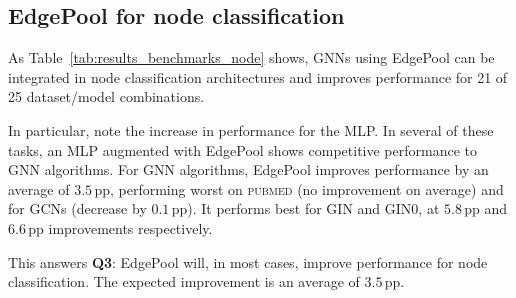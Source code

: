 \documentclass{article}
\newcommand{\tableref}[1]{Table~\ref{#1}}
\newcommand{\edgepool}{EdgePool}
\newcommand{\datasetname}[1]{\textsc{#1}}
\newcommand{\pubmed}{\datasetname{pubmed}}
\newcommand{\pp}{\,\gls{pp}}
\begin{document}
\subsection{\edgepool{} for node classification}

As \tableref{tab:results_benchmarks_node} shows, \glspl{GNN} using \edgepool{} can be integrated in node classification architectures and improves performance for 21 of 25 dataset/model combinations.

In particular, note the increase in performance for the \gls{MLP}. In several of these tasks, an \gls{MLP} augmented with \edgepool{} shows competitive performance to \gls{GNN} algorithms. For \gls{GNN} algorithms, \edgepool{} improves performance by an average of $3.5$\pp{}, performing worst on \pubmed{} (no improvement on average) and for \glspl{GCN} (decrease by $0.1$\pp{}). It performs best for GIN and GIN0, at $5.8$\pp{} and $6.6$\pp{} improvements respectively.

This answers \textbf{Q3}: \edgepool{} will, in most cases, improve performance for node classification. The expected improvement is an average of $3.5$\pp{}.
\end{document}
